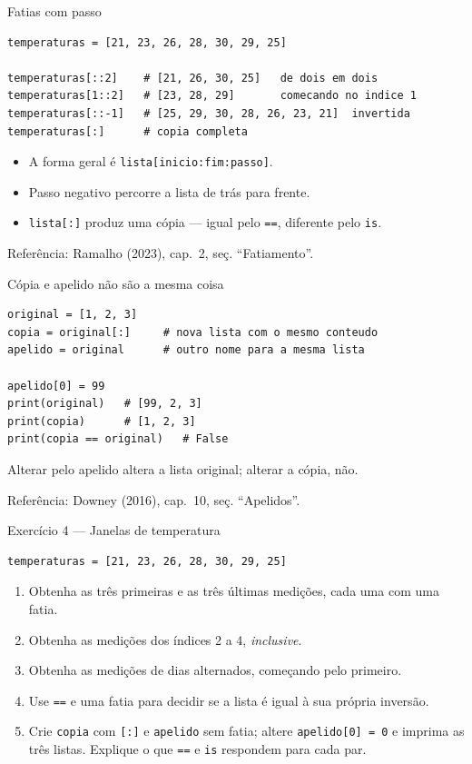 \documentclass[aspectratio=169]{beamer}
\newcommand{\fonte}[1]{\vfill{\scriptsize\color{UFSGray}Refer\^encia: #1}}
\begin{document}
\begin{frame}[fragile]{Fatias com passo}
\begin{lstlisting}
temperaturas = [21, 23, 26, 28, 30, 29, 25]

temperaturas[::2]    # [21, 26, 30, 25]   de dois em dois
temperaturas[1::2]   # [23, 28, 29]       comecando no indice 1
temperaturas[::-1]   # [25, 29, 30, 28, 26, 23, 21]  invertida
temperaturas[:]      # copia completa
\end{lstlisting}

\begin{itemize}
  \item A forma geral é \texttt{lista[inicio:fim:passo]}.
  \item Passo negativo percorre a lista de trás para frente.
  \item \texttt{lista[:]} produz uma cópia --- igual pelo \texttt{==}, diferente pelo \texttt{is}.
\end{itemize}

\fonte{Ramalho (2023), cap.\ 2, se\c{c}. ``Fatiamento''.}
\end{frame}

\begin{frame}[fragile]{Cópia e apelido não são a mesma coisa}
\begin{lstlisting}
original = [1, 2, 3]
copia = original[:]     # nova lista com o mesmo conteudo
apelido = original      # outro nome para a mesma lista

apelido[0] = 99
print(original)   # [99, 2, 3]
print(copia)      # [1, 2, 3]
print(copia == original)   # False
\end{lstlisting}

Alterar pelo apelido altera a lista original; alterar a cópia, não.

\fonte{Downey (2016), cap.\ 10, se\c{c}. ``Apelidos''.}
\end{frame}

\begin{frame}[fragile]{Exercício 4 --- Janelas de temperatura}
\begin{lstlisting}
temperaturas = [21, 23, 26, 28, 30, 29, 25]
\end{lstlisting}

\begin{enumerate}
  \item Obtenha as três primeiras e as três últimas medições, cada uma com uma fatia.
  \item Obtenha as medições dos índices 2 a 4, \emph{inclusive}.
  \item Obtenha as medições de dias alternados, começando pelo primeiro.
  \item Use \texttt{==} e uma fatia para decidir se a lista é igual à sua própria inversão.
  \item Crie \texttt{copia} com \texttt{[:]} e \texttt{apelido} sem fatia; altere \texttt{apelido[0] = 0} e imprima as três listas. Explique o que \texttt{==} e \texttt{is} respondem para cada par.
\end{enumerate}
\end{frame}
\end{document}
